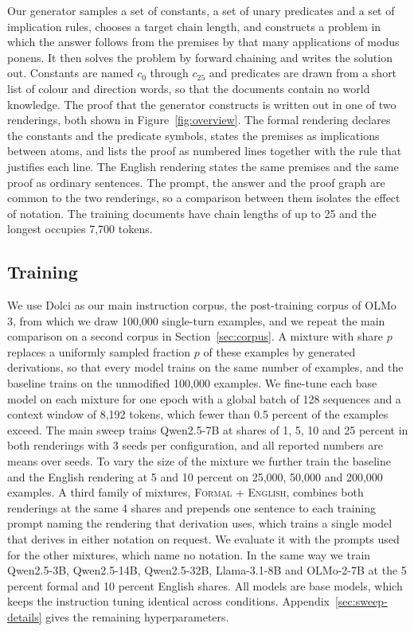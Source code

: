 \documentclass{article}
\newcommand{\formal}{\textsc{Formal}}
\newcommand{\nat}{\textsc{English}}
\begin{document}
Our generator samples a set of constants, a set of unary predicates and a set
of implication rules, chooses a target chain length, and constructs a problem
in which the answer follows from the premises by that many applications of modus
ponens. It then solves the problem by forward chaining and writes the
solution out. Constants are named $c_0$ through $c_{25}$ and predicates are
drawn from a short list of colour and direction words, so that the documents
contain no world knowledge. The proof that the generator constructs is
written out in one of two renderings, both shown in
Figure~\ref{fig:overview}. The formal rendering
declares the constants and the predicate symbols, states the premises as
implications between atoms, and lists the proof as numbered lines together
with the rule that justifies each line. The English rendering states the
same premises and the same proof as ordinary sentences. The prompt, the
answer and the proof graph are common to the two renderings, so a comparison
between them isolates the effect of notation. The training documents have
chain lengths of up to 25 and the longest occupies 7{,}700 tokens.


\subsection{Training}

We use Dolci \citep{olmo2025olmo2} as our main instruction corpus, the post-training
corpus of OLMo 3, from which we draw 100{,}000 single-turn examples, and we
repeat the main comparison on a second corpus in Section~\ref{sec:corpus}. A mixture with share $p$ replaces a uniformly sampled fraction $p$ of these
examples by generated derivations, so that every model trains on the same
number of examples, and the baseline trains on the unmodified 100{,}000
examples. We fine-tune each base model on each mixture for one epoch with a
global batch of 128 sequences and a context window of 8{,}192 tokens, which
fewer than 0.5 percent of the examples exceed. The main sweep trains
Qwen2.5-7B at shares of 1, 5, 10 and 25 percent in both renderings with 3
seeds per configuration, and all reported numbers are means over seeds. To vary the
size of the mixture we further train the baseline and the English rendering at 5
and 10 percent on 25{,}000, 50{,}000 and 200{,}000 examples. A third family of mixtures, \formal{} + \nat{}, combines both renderings at
the same 4 shares and prepends one sentence to each training prompt naming the
rendering that derivation uses, which trains a single model that derives in
either notation on request. We evaluate it with the prompts used for the other
mixtures, which name no notation. In the
same way we train Qwen2.5-3B, Qwen2.5-14B, Qwen2.5-32B, Llama-3.1-8B and
OLMo-2-7B at the 5 percent formal and 10 percent English shares. All models
are base models, which keeps the instruction tuning identical across
conditions. Appendix~\ref{sec:sweep-details} gives the remaining
hyperparameters.
\end{document}
